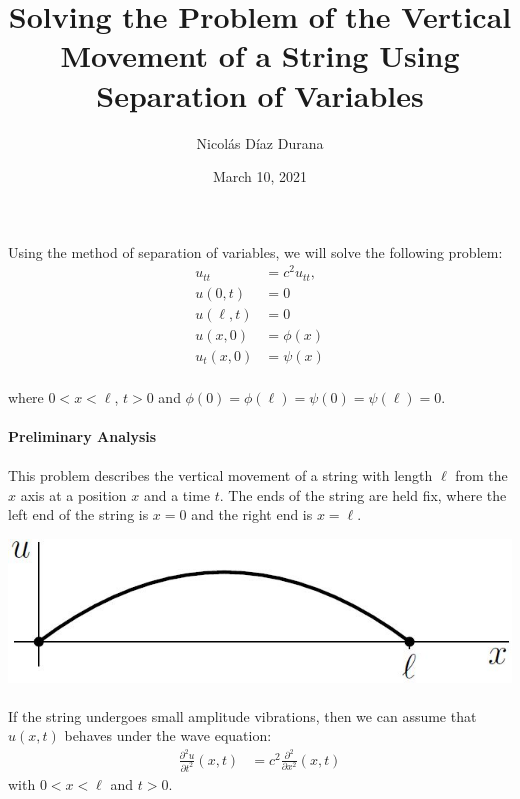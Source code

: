 \documentclass[letter]{article}
\title{Solving the Problem of the Vertical Movement of a String Using Separation of Variables}
\author{Nicolás Díaz Durana}
\date{March 10, 2021}
\begin{document}
\maketitle
\paragraph{}Using the method of separation of variables, we will solve the following problem:
    \begin{equation}
        \begin{split}
            u_{tt} &= c^2u_{tt},\\
            u(0,t) &= 0\\
            u(\ell,t) &= 0\\
            u(x,0) &= \phi(x)\\
            u_t(x,0) &= \psi(x)
        \end{split}
    \end{equation}
    \paragraph{}where $0<x<\ell$, $t>0$ and $\phi(0)=\phi(\ell)=\psi(0)=\psi(\ell)=0$.\\
    \paragraph{}\textbf{Preliminary Analysis}
    \paragraph{}This problem describes the vertical movement of a string with length $\ell$ from the $x$ axis at a position $x$  and a time $t$. The ends of the string are held fix, where the left end of the string is $x=0$ and the right end is $x=\ell$.
    \begin{center}     \includegraphics[width=.35\textwidth]{wave_func.JPG}
    \end{center}
    \paragraph{}If the string undergoes small amplitude vibrations, then we can assume that $u(x,t)$ behaves under the wave equation:
    \begin{equation}
        \begin{split}
            \frac{\partial^2u}{\partial t^2}(x,t) &= c^2\frac{\partial^2}{\partial x^2}(x,t)
        \end{split}
    \end{equation}
    with $0<x<\ell$ and $t>0$.
\end{document}
